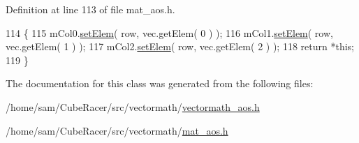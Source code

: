 Definition at line 113 of file mat\-\_\-aos.\-h.


\begin{DoxyCode}
114 \{
115     mCol0.\hyperlink{classVectormath_1_1Aos_1_1Vector3_a74793bcd127eae5b275fe28fd958c025}{setElem}( row, vec.getElem( 0 ) );
116     mCol1.\hyperlink{classVectormath_1_1Aos_1_1Vector3_a74793bcd127eae5b275fe28fd958c025}{setElem}( row, vec.getElem( 1 ) );
117     mCol2.\hyperlink{classVectormath_1_1Aos_1_1Vector3_a74793bcd127eae5b275fe28fd958c025}{setElem}( row, vec.getElem( 2 ) );
118     \textcolor{keywordflow}{return} *\textcolor{keyword}{this};
119 \}
\end{DoxyCode}


The documentation for this class was generated from the following files\-:\begin{DoxyCompactItemize}
\item 
/home/sam/\-Cube\-Racer/src/vectormath/\hyperlink{vectormath__aos_8h}{vectormath\-\_\-aos.\-h}\item 
/home/sam/\-Cube\-Racer/src/vectormath/\hyperlink{mat__aos_8h}{mat\-\_\-aos.\-h}\end{DoxyCompactItemize}
